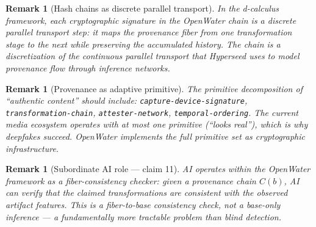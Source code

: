 \documentclass[11pt,a4paper]{article}
\newtheorem{remark}[definition]{Remark}
\begin{document}
\begin{remark}[Hash chains as discrete parallel transport]
In the d-calculus framework, each cryptographic signature in the
OpenWater chain is a discrete parallel transport step: it maps the
provenance fiber from one transformation stage to the next while
preserving the accumulated history. The chain is a discretization of
the continuous parallel transport that Hyperseed uses to model
provenance flow through inference networks.
\end{remark}

\begin{remark}[Provenance as adaptive primitive]
The primitive decomposition of ``authentic content'' should include:
\texttt{capture-device-signature}, \texttt{transformation-chain},
\texttt{attester-network}, \texttt{temporal-ordering}. The current
media ecosystem operates with at most one primitive (``looks real''),
which is why deepfakes succeed. OpenWater implements the full
primitive set as cryptographic infrastructure.
\end{remark}

\begin{remark}[Subordinate AI role --- claim 11]
AI operates within the OpenWater framework as a fiber-consistency
checker: given a provenance chain $C(b)$, AI can verify that the
claimed transformations are consistent with the observed artifact
features. This is a fiber-to-base consistency check, not a base-only
inference --- a fundamentally more tractable problem than blind
detection.
\end{remark}
\end{document}
